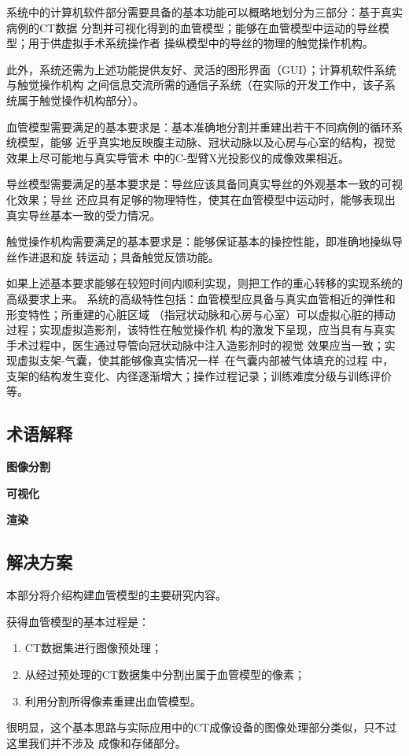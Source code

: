 系统中的计算机软件部分需要具备的基本功能可以概略地划分为三部分：基于真实病例的CT数据
分割并可视化得到的血管模型；能够在血管模型中运动的导丝模型；用于供虚拟手术系统操作者
操纵模型中的导丝的物理的触觉操作机构。

此外，系统还需为上述功能提供友好、灵活的图形界面（GUI）；计算机软件系统与触觉操作机构
之间信息交流所需的通信子系统（在实际的开发工作中，该子系统属于触觉操作机构部分）。

血管模型需要满足的基本要求是：基本准确地分割并重建出若干不同病例的循环系统模型，能够
近乎真实地反映腹主动脉、冠状动脉以及心房与心室的结构，视觉效果上尽可能地与真实导管术
中的C-型臂X光投影仪的成像效果相近。

导丝模型需要满足的基本要求是：导丝应该具备同真实导丝的外观基本一致的可视化效果；导丝
还应具有足够的物理特性，使其在血管模型中运动时，能够表现出真实导丝基本一致的受力情况。

触觉操作机构需要满足的基本要求是：能够保证基本的操控性能，即准确地操纵导丝作进退和旋
转运动；具备触觉反馈功能。

如果上述基本要求能够在较短时间内顺利实现，则把工作的重心转移的实现系统的高级要求上来。
系统的高级特性包括：血管模型应具备与真实血管相近的弹性和形变特性；所重建的心脏区域
（指冠状动脉和心房与心室）可以虚拟心脏的搏动过程；实现虚拟造影剂，该特性在触觉操作机
构的激发下呈现，应当具有与真实手术过程中，医生通过导管向冠状动脉中注入造影剂时的视觉
效果应当一致；实现虚拟支架-气囊，使其能够像真实情况一样--在气囊内部被气体填充的过程
中，支架的结构发生变化、内径逐渐增大；操作过程记录；训练难度分级与训练评价等。

\subsection{术语解释}
\label{subsec1-1-2}

\textbf{图像分割}

\textbf{可视化}

\textbf{渲染}

\subsection{解决方案}
\label{subsec1-1-3}

本部分将介绍构建血管模型的主要研究内容。

获得血管模型的基本过程是：
\begin{enumerate}
  \item CT数据集进行图像预处理；
  \item 从经过预处理的CT数据集中分割出属于血管模型的像素；
  \item 利用分割所得像素重建出血管模型。
\end{enumerate}
很明显，这个基本思路与实际应用中的CT成像设备的图像处理部分类似，只不过这里我们并不涉及
成像和存储部分。

